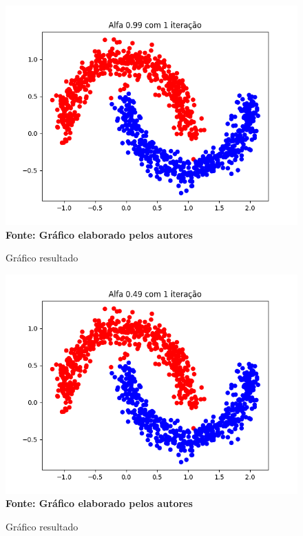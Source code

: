 \documentclass[12pt]{article}
\begin{document}
\begin{figure}[ht]
	\centering	
	\caption[\hspace{0.1cm}Gráfico Acurácia.]{Gráfico resultado}
	\vspace{-0.4cm}
	\includegraphics[width=.6\textwidth]{1_099.png}
	\\\textbf{\footnotesize  Fonte: Gráfico elaborado pelos autores }
	\label{fig:figura1}
\end{figure}

\begin{figure}[ht]
	\centering	
	\caption[\hspace{0.1cm}Gráfico Acurácia.]{Gráfico resultado}
	\vspace{-0.4cm}
	\includegraphics[width=.6\textwidth]{1_049.png}
	\\\textbf{\footnotesize  Fonte: Gráfico elaborado pelos autores }
	\label{fig:figura1}
\end{figure}
\newpage
\end{document}
